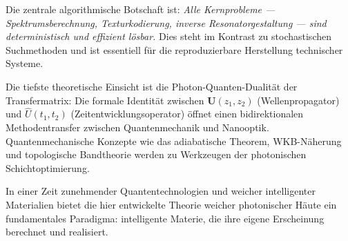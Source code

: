 ﻿\documentclass[a4paper,12pt]{article}
\theoremstyle{definition}
\newcommand{\matr}[1]{\mathbf{#1}}
\begin{document}
	Die zentrale algorithmische Botschaft ist: \emph{Alle Kernprobleme
		--- Spektrumsberechnung, Texturkodierung, inverse Resonatorgestaltung ---
		sind deterministisch und effizient lösbar.} Dies steht im Kontrast zu
	stochastischen Suchmethoden und ist essentiell für die reproduzierbare
	Herstellung technischer Systeme.
	
	Die tiefste theoretische Einsicht ist die Photon-Quanten-Dualität der
	Transfermatrix: Die formale Identität zwischen $\matr{U}(z_1,z_2)$
	(Wellenpropagator) und $\hat{U}(t_1,t_2)$ (Zeitentwicklungsoperator)
	öffnet einen bidirektionalen Methodentransfer zwischen Quantenmechanik
	und Nanooptik. Quantenmechanische Konzepte wie das adiabatische Theorem,
	WKB-Näherung und topologische Bandtheorie werden zu Werkzeugen der
	photonischen Schichtoptimierung.
	
	In einer Zeit zunehmender Quantentechnologien und weicher intelligenter
	Materialien bietet die hier entwickelte Theorie weicher photonischer
	Häute ein fundamentales Paradigma: intelligente Materie, die ihre eigene
	Erscheinung berechnet und realisiert.
	
\end{document}
